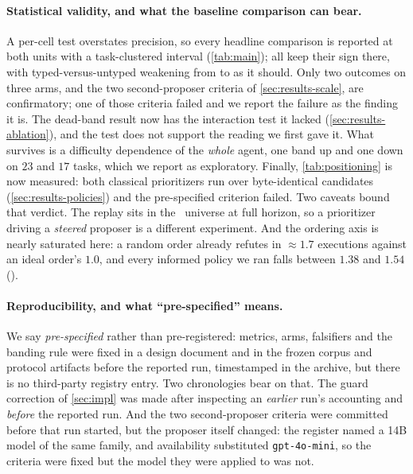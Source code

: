 \paragraph{Statistical validity, and what the baseline comparison can bear.}
A per-cell test overstates precision, so every headline comparison is reported
at both units with a task-clustered interval (\cref{tab:main}); all keep their
sign there, with typed-versus-untyped weakening from  to
 as it should. Only two outcomes on three arms, and the two
second-proposer criteria of \cref{sec:results-scale}, are confirmatory; one of
those criteria failed and we report the failure as the finding it is.
The dead-band result now has the interaction test it lacked
(\cref{sec:results-ablation}), and the test does not support the reading we
first gave it. What survives is a difficulty dependence of the \emph{whole}
agent, one band up and one down on $23$ and $17$ tasks, which we report as
exploratory. Finally, \cref{tab:positioning} is now measured: both classical prioritizers
run over byte-identical candidates (\cref{sec:results-policies}) and the
pre-specified criterion failed. Two caveats bound that verdict. The replay sits
in the \armnomem\ universe at full horizon, so a prioritizer driving a
\emph{steered} proposer is a different experiment. And the ordering axis is nearly
saturated here: a random order already refutes in ${\approx}1.7$ executions
against an ideal order's $1.0$, and every informed policy we ran falls between
$1.38$ and $1.54$ ().

\paragraph{Reproducibility, and what ``pre-specified'' means.}
We say \emph{pre-specified} rather than pre-registered: metrics, arms,
falsifiers and the banding rule were fixed in a design document and in the
frozen corpus and protocol artifacts before the reported run, timestamped in
the archive, but there is no third-party registry entry. Two chronologies bear
on that. The guard correction of \cref{sec:impl} was made after inspecting an
\emph{earlier} run's accounting and \emph{before} the reported run. And the two
second-proposer criteria were committed before that run started, but the
proposer itself changed: the register named a 14B model of the same family, and
availability substituted \texttt{gpt-4o-mini}, so the criteria were fixed but
the model they were applied to was not.

